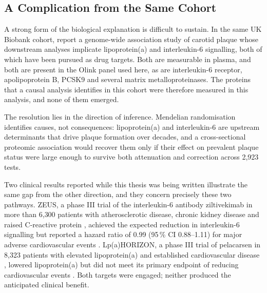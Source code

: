 \subsection{A Complication from the Same Cohort}

A strong form of the biological explanation is difficult to sustain. In the same UK Biobank
cohort, \textcite{omarov2024deep} report a genome-wide association study of carotid plaque whose
downstream analyses implicate lipoprotein(a) and interleukin-6 signalling, both of which have
been pursued as drug targets. Both are measurable in plasma, and both are present in the
Olink panel used here, as are interleukin-6 receptor, apolipoprotein B, PCSK9 and several matrix
metalloproteinases. The proteins that a causal analysis identifies in this cohort were therefore
measured in this analysis, and none of them emerged.

The resolution lies in the direction of inference. Mendelian randomisation identifies causes, not
consequences: lipoprotein(a) and interleukin-6 are upstream determinants that drive plaque
formation over decades, and a cross-sectional proteomic association would recover them only if
their effect on prevalent plaque status were large enough to survive both attenuation and
correction across 2{,}923 tests.

Two clinical results reported while this thesis was being written illustrate the same gap from
the other direction, and they concern precisely these two pathways. ZEUS, a phase III trial of
the interleukin-6 antibody ziltivekimab in more than 6{,}300 patients with atherosclerotic
disease, chronic kidney disease and raised C-reactive protein
\cite{ridker2026zeusdesign}, achieved the expected reduction in interleukin-6 signalling but
reported a hazard ratio of 0.99 (95\,\% CI 0.88--1.11) for major adverse cardiovascular events
\cite{novonordisk2026zeus, yao2026zeuscommentary}. Lp(a)HORIZON, a phase III trial of
pelacarsen in 8{,}323 patients with elevated lipoprotein(a) and established cardiovascular
disease \cite{cho2025horizondesign}, lowered lipoprotein(a) but did not meet its primary
endpoint of reducing cardiovascular events \cite{novartis2026pelacarsen}. Both targets were engaged; neither produced the
anticipated clinical benefit.

